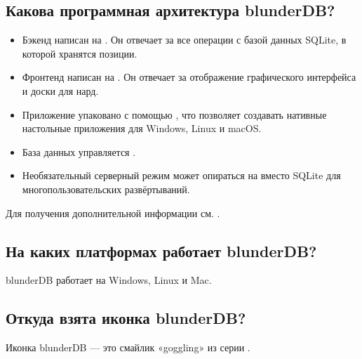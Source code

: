 \documentclass[letterpaper,10pt,russian]{sphinxmanual}
\begin{document}
\subsection{Какова программная архитектура blunderDB?}
\label{\detokenize{faq:quel-est-l-architecture-logicielle-de-blunderdb}}\begin{itemize}
\item {} 
\sphinxAtStartPar
Бэкенд написан на . Он отвечает за все операции с базой данных SQLite, в которой хранятся позиции.

\item {} 
\sphinxAtStartPar
Фронтенд написан на . Он отвечает за отображение графического интерфейса и доски для нард.

\item {} 
\sphinxAtStartPar
Приложение упаковано с помощью , что позволяет создавать нативные настольные приложения для Windows, Linux и macOS.

\item {} 
\sphinxAtStartPar
База данных управляется .

\item {} 
\sphinxAtStartPar
Необязательный серверный режим может опираться на  вместо SQLite для многопользовательских развёртываний.

\end{itemize}

\sphinxAtStartPar
Для получения дополнительной информации см. .


\subsection{На каких платформах работает blunderDB?}
\label{\detokenize{faq:sur-quelles-plateformes-blunderdb-fonctionne-t-il}}
\sphinxAtStartPar
blunderDB работает на Windows, Linux и Mac.


\subsection{Откуда взята иконка blunderDB?}
\label{\detokenize{faq:d-ou-vient-l-icone-de-blunderdb}}
\sphinxAtStartPar
Иконка blunderDB — это смайлик «goggling» из серии .
\end{document}
